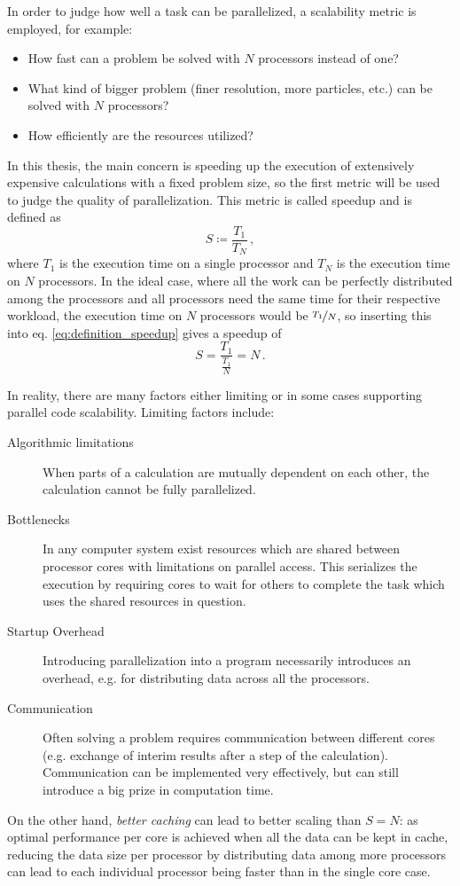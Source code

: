 \documentclass[main.tex]{subfiles}
\begin{document}
In order to judge how well a task can be parallelized, a scalability metric is employed, for example:
\begin{itemize}
    \item How fast can a problem be solved with \(N\) processors instead of one?
    \item What kind of bigger problem (finer resolution, more particles, etc.) can be solved with \(N\) processors?
    \item How efficiently are the resources utilized?
\end{itemize}
In this thesis, the main concern is speeding up the execution of extensively expensive calculations with a fixed problem size, so the first metric will be used to judge the quality of parallelization.
This metric is called speedup and is defined as 
\begin{equation}\label{eq:definition_speedup}
    S \coloneqq \frac{T_1}{T_N}\,, 
\end{equation}
where \(T_1\) is the execution time on a single processor and \(T_N\) is the execution time on \(N\) processors.
In the ideal case, where all the work can be perfectly distributed among the processors and all processors need the same time for their respective workload, the execution time on \(N\) processors would be \(\nicefrac{T_1}{N}\), so inserting this into eq. \ref{eq:definition_speedup} gives a speedup of
\begin{equation}\label{eq:ideal_speedup}
    S = \frac{T_1}{\frac{T_1}{N}} = N\,.
\end{equation}

In reality, there are many factors either limiting or in some cases supporting parallel code scalability. Limiting factors include:
\begin{description}
    \item[Algorithmic limitations] When parts of a calculation are mutually dependent on each other, the calculation cannot be fully parallelized.
    \item[Bottlenecks] In any computer system exist resources which are shared between processor cores with limitations on parallel access. This serializes the execution by requiring cores to wait for others to complete the task which uses the shared resources in question.
    \item[Startup Overhead] Introducing parallelization into a program necessarily introduces an overhead, e.g. for distributing data across all the processors.
    \item[Communication] Often solving a problem requires communication between different cores (e.g. exchange of interim results after a step of the calculation). Communication can be implemented very effectively, but can still introduce a big prize in computation time.
\end{description}
On the other hand, \emph{better caching} can lead to better scaling than \(S = N\): as optimal performance per core is achieved when all the data can be kept in cache, reducing the data size per processor by distributing data among more processors can lead to each individual processor being faster than in the single core case.
\end{document}
